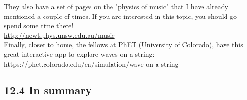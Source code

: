 \documentclass[10pt]{article}
\begin{document}
They also have a set of pages on the "physics of music" that I have already mentioned a couple of times. If you are interested in this topic, you should go spend some time there!\\
\href{http://newt.phys.unsw.edu.au/music}{http://newt.phys.unsw.edu.au/music}\\
Finally, closer to home, the fellows at PhET (University of Colorado), have this great interactive app to explore waves on a string:\\
\href{https://phet.colorado.edu/en/simulation/wave-on-a-string}{https://phet.colorado.edu/en/simulation/wave-on-a-string}

\subsection*{12.4 In summary}
\end{document}
